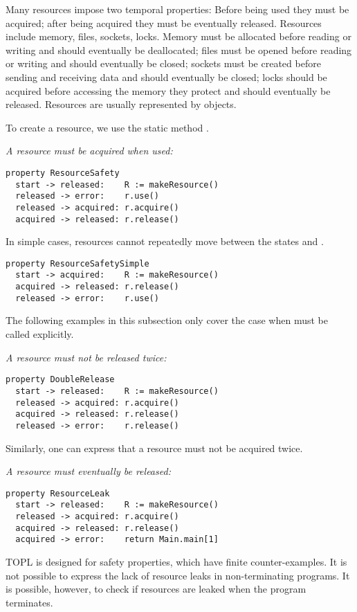 \documentclass[preprint]{sigplanconf} %
\newcommand{\delimitVerbatim}{\par\nobreak\smallskip\noindent}
\theoremstyle{definition}
\theoremstyle{remark}
\begin{document}
Many resources impose two temporal properties:
Before being used they must be acquired;
after being acquired they must be eventually released.
Resources include memory, files, sockets, locks.
Memory must be allocated before reading or writing and should eventually be deallocated;
files must be opened before reading or writing and should eventually be closed;
sockets must be created before sending and receiving data and should eventually be closed;
locks should be acquired before accessing the memory they protect and should eventually be released.
Resources are usually represented by objects.
\delimitVerbatim

\delimitVerbatim
To create a resource, we use the static method \Verb@makeResource@.

\medskip\emph{A resource must be acquired when used:}
\delimitVerbatim
\begin{Verbatim}
property ResourceSafety
  start -> released:    R := makeResource()
  released -> error:    r.use()
  released -> acquired: r.acquire()
  acquired -> released: r.release()
\end{Verbatim}
\delimitVerbatim
In simple cases, resources cannot repeatedly move between the states \Verb@released@ and \Verb@acquired@.
\delimitVerbatim
\begin{Verbatim}
property ResourceSafetySimple
  start -> acquired:    R := makeResource()
  acquired -> released: r.release()
  released -> error:    r.use()
\end{Verbatim}
\delimitVerbatim
The following examples in this subsection only cover the case when \Verb@acquire@ must be called explicitly.

\medskip\emph{A resource must not be released twice:}
\delimitVerbatim
\begin{Verbatim}
property DoubleRelease
  start -> released:    R := makeResource()
  released -> acquired: r.acquire()
  acquired -> released: r.release()
  released -> error:    r.release()
\end{Verbatim}
\delimitVerbatim
Similarly, one can express that a resource must not be acquired twice.

\medskip\emph{A resource must eventually be released:}
\delimitVerbatim
\begin{Verbatim}
property ResourceLeak
  start -> released:    R := makeResource()
  released -> acquired: r.acquire()
  acquired -> released: r.release()
  acquired -> error:    return Main.main[1]
\end{Verbatim}
\delimitVerbatim
TOPL is designed for safety properties, which have finite counter-examples.
It is not possible to express the lack of resource leaks in non-terminating programs.
It is possible, however, to check if resources are leaked when the program terminates.
\end{document}
